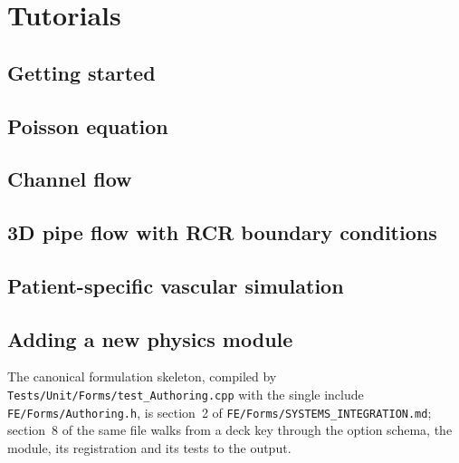 \chapter{Tutorials}
\label{ch:tutorials}

\section{Getting started}
\label{sec:tutorials:start}


\section{Poisson equation}
\label{sec:tutorials:poisson}


\section{Channel flow}
\label{sec:tutorials:channel}


\section{3D pipe flow with RCR boundary conditions}
\label{sec:tutorials:pipe}


\section{Patient-specific vascular simulation}
\label{sec:tutorials:patient}


\section{Adding a new physics module}
\label{sec:tutorials:newphysics}

The canonical formulation skeleton, compiled by
\texttt{Tests/Unit/Forms/test\_Authoring.cpp} with the single include
\texttt{FE/Forms/Authoring.h}, is section~2 of
\texttt{FE/Forms/SYSTEMS\_INTEGRATION.md}; section~8 of the same file walks
from a deck key through the option schema, the module, its registration and
its tests to the output.

